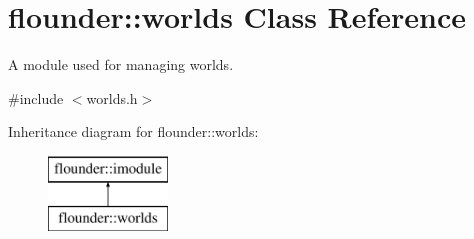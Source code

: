 \hypertarget{classflounder_1_1worlds}{}\section{flounder\+:\+:worlds Class Reference}
\label{classflounder_1_1worlds}


A module used for managing worlds.  




{\ttfamily \#include $<$worlds.\+h$>$}

Inheritance diagram for flounder\+:\+:worlds\+:\begin{figure}[H]
\begin{center}
\leavevmode
\includegraphics[height=2.000000cm]{classflounder_1_1worlds}
\end{center}
\end{figure}
